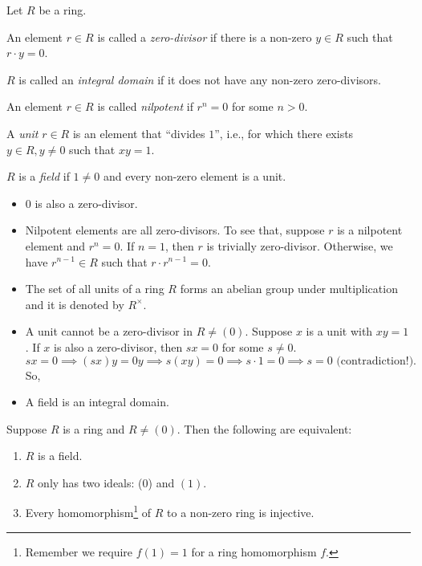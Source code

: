 \begin{definition}
    Let \(R\) be a ring.

    An element \(r \in R\) is called a \emph{zero-divisor} if there is a non-zero \(y \in R\) such that \(r \cdot y = 0\).

    \(R\) is called an \emph{integral domain} if it does not have any non-zero zero-divisors.

An element \(r \in R\) is called \emph{nilpotent} if \(r^n = 0\) for some \(n > 0\).

A \emph{unit} \(r \in R\) is an element that ``divides \(1\)'', i.e., for which there exists \(y \in R, y \neq 0\) such that \(xy = 1\).

\(R\) is a \emph{field} if \(1 \neq 0\) and every non-zero element is a unit.
\end{definition}
\begin{remark}
    \begin{itemize}
        \item \(0\) is also a zero-divisor.
        \item Nilpotent elements are all zero-divisors. To see that, suppose \(r\) is a nilpotent element and \(r^n = 0\). If \(n = 1\), then \(r\) is trivially zero-divisor. Otherwise, we have \(r^{n-1} \in R\) such that \(r \cdot r^{n-1} = 0\).
        \item The set of all units of a ring \(R\) forms an abelian group under multiplication and it is denoted by \(R^\times\).
        \item A unit cannot be a zero-divisor in \(R \neq (0)\). Suppose \(x\) is a unit with \(xy = 1\). If \(x\) is also a zero-divisor, then \(sx = 0\) for some \(s \neq 0\). \[sx = 0 \implies (sx)y = 0y \implies s(xy) = 0 \implies s \cdot 1 = 0  \implies s = 0 \text{ (contradiction!}).\] So,
        \item A field is an integral domain.
    \end{itemize}
\end{remark}
\begin{proposition}
    Suppose \(R\) is a ring and \(R \neq (0)\). Then the following are equivalent:
    \begin{enumerate}
        \item \(R\) is a field.
        \item \(R\) only has two ideals: (0) and \((1)\).
        \item Every homomorphism\footnote{Remember we require \(f(1) = 1\) for a ring homomorphism \(f\).} of \(R\) to a non-zero ring is injective.
    \end{enumerate}
\end{proposition}
